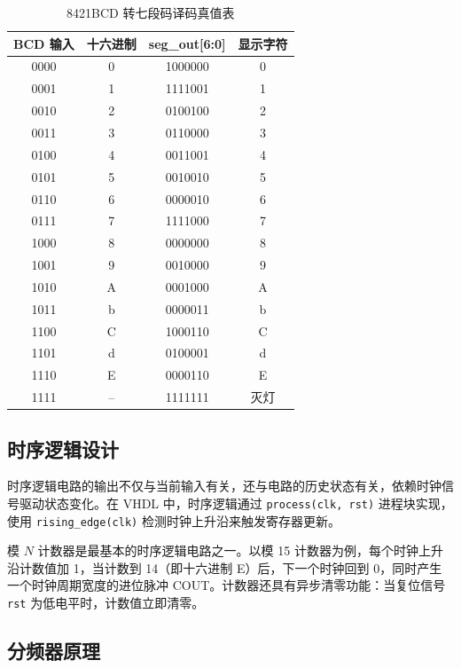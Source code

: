 \documentclass[12pt]{ctexart}
\begin{document}
\begin{table}[H]
    \centering
    \caption{8421BCD 转七段码译码真值表}
    \label{tab:hex_decode}
    \begin{tabular}{cccc}
        \toprule
        \textbf{BCD 输入} & \textbf{十六进制} & \textbf{seg\_out[6:0]} & \textbf{显示字符} \\
        \midrule
        0000 & 0 & 1000000 & 0 \\
        0001 & 1 & 1111001 & 1 \\
        0010 & 2 & 0100100 & 2 \\
        0011 & 3 & 0110000 & 3 \\
        0100 & 4 & 0011001 & 4 \\
        0101 & 5 & 0010010 & 5 \\
        0110 & 6 & 0000010 & 6 \\
        0111 & 7 & 1111000 & 7 \\
        1000 & 8 & 0000000 & 8 \\
        1001 & 9 & 0010000 & 9 \\
        1010 & A & 0001000 & A \\
        1011 & b & 0000011 & b \\
        1100 & C & 1000110 & C \\
        1101 & d & 0100001 & d \\
        1110 & E & 0000110 & E \\
        1111 & -- & 1111111 & 灭灯 \\
        \bottomrule
    \end{tabular}
\end{table}

\subsection{时序逻辑设计}

时序逻辑电路的输出不仅与当前输入有关，还与电路的历史状态有关，依赖时钟信号驱动状态变化。在 VHDL 中，时序逻辑通过 \texttt{process(clk, rst)} 进程块实现，使用 \texttt{rising\_edge(clk)} 检测时钟上升沿来触发寄存器更新。

模 $N$ 计数器是最基本的时序逻辑电路之一。以模 15 计数器为例，每个时钟上升沿计数值加 1，当计数到 14（即十六进制 E）后，下一个时钟回到 0，同时产生一个时钟周期宽度的进位脉冲 COUT。计数器还具有异步清零功能：当复位信号 \texttt{rst} 为低电平时，计数值立即清零。

\subsection{分频器原理}
\end{document}

